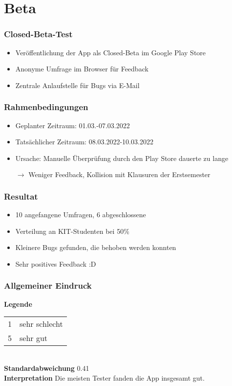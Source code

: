 \section{Beta}

\begin{frame}\frametitle{Closed-Beta-Test}
    \begin{itemize}
        \item Veröffentlichung der App als Closed-Beta im Google Play Store
        \item Anonyme Umfrage im Browser für Feedback
        \item Zentrale Anlaufstelle für Bugs via E-Mail
    \end{itemize}
\end{frame}

\begin{frame}\frametitle{Rahmenbedingungen}
    \begin{itemize}
        \item Geplanter Zeitraum: 01.03.-07.03.2022
        \item Tatsächlicher Zeitraum: 08.03.2022-10.03.2022
        \item Ursache: Manuelle Überprüfung durch den Play Store dauerte zu lange
        \item[$\rightarrow$] Weniger Feedback, Kollision mit Klausuren der Erstsemester
    \end{itemize}
\end{frame}

\begin{frame}\frametitle{Resultat}
    \begin{itemize}
        \item 10 angefangene Umfragen, 6 abgeschlossene
        \item Verteilung an KIT-Studenten bei 50\%
        \item Kleinere Bugs gefunden, die behoben werden konnten
        \item Sehr positives Feedback :D
    \end{itemize}
\end{frame}

\begin{frame}\frametitle{Allgemeiner Eindruck}
    \begin{minipage}{\textwidth}
        \begin{minipage}{.49\textwidth}
        \end{minipage}
        \begin{minipage}{.49\textwidth}
            \textbf{Legende} 
            \begin{tabular}{l l}
                1 & sehr schlecht \\
                5 & sehr gut
            \end{tabular}\\
            \textbf{Standardabweichung}
            0.41\\
            \textbf{Interpretation}
            Die meisten Tester fanden die App insgesamt gut.
        \end{minipage}
    \end{minipage}
\end{frame}

